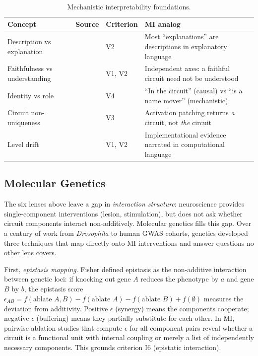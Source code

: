 \documentclass[10pt]{article}
\begin{document}
\begin{table}[H]
\centering\small
\caption{Mechanistic interpretability foundations.}
\renewcommand{\arraystretch}{1.12}
\begin{tabular}{@{}l>{\raggedright\arraybackslash}p{2.2cm}l>{\raggedright\arraybackslash}p{4.5cm}@{}}
\toprule
\textbf{Concept} & \textbf{Source} & \textbf{Criterion} & \textbf{MI analog} \\
\midrule
Description vs explanation & \citet{olsson2022context} & V2 & Most ``explanations'' are descriptions in explanatory language \\
\midrule
Faithfulness vs understanding & \citet{wang2023interpretability} & V1, V2 & Independent axes: a faithful circuit need not be understood \\
\midrule
Identity vs role & \citet{wang2023interpretability} & V4 & ``In the circuit'' (causal) vs ``is a name mover'' (mechanistic) \\
\midrule
Circuit non-uniqueness & \citet{meloux2025everything} & V3 & Activation patching returns \emph{a} circuit, not \emph{the} circuit \\
\midrule
Level drift & \citet{marr1982vision} & V1, V2 & Implementational evidence narrated in computational language \\
\bottomrule
\end{tabular}
\end{table}

\subsection{Molecular Genetics}
\label{sec:genetics}

The six lenses above leave a gap in \emph{interaction structure}: neuroscience provides single-component interventions (lesion, stimulation), but does not ask whether circuit components interact non-additively. Molecular genetics fills this gap. Over a century of work from \emph{Drosophila} to human GWAS cohorts, genetics developed three techniques that map directly onto MI interventions and answer questions no other lens covers.

First, \emph{epistasis mapping}. Fisher defined epistasis as the non-additive interaction between genetic loci: if knocking out gene $A$ reduces the phenotype by $a$ and gene $B$ by $b$, the epistasis score $\epsilon_{AB} = f(\text{ablate } A, B) - f(\text{ablate } A) - f(\text{ablate } B) + f(\emptyset)$ measures the deviation from additivity. Positive $\epsilon$ (synergy) means the components cooperate; negative $\epsilon$ (buffering) means they partially substitute for each other. In MI, pairwise ablation studies that compute $\epsilon$ for all component pairs reveal whether a circuit is a functional unit with internal coupling or merely a list of independently necessary components. This grounds criterion I6 (epistatic interaction).
\end{document}
